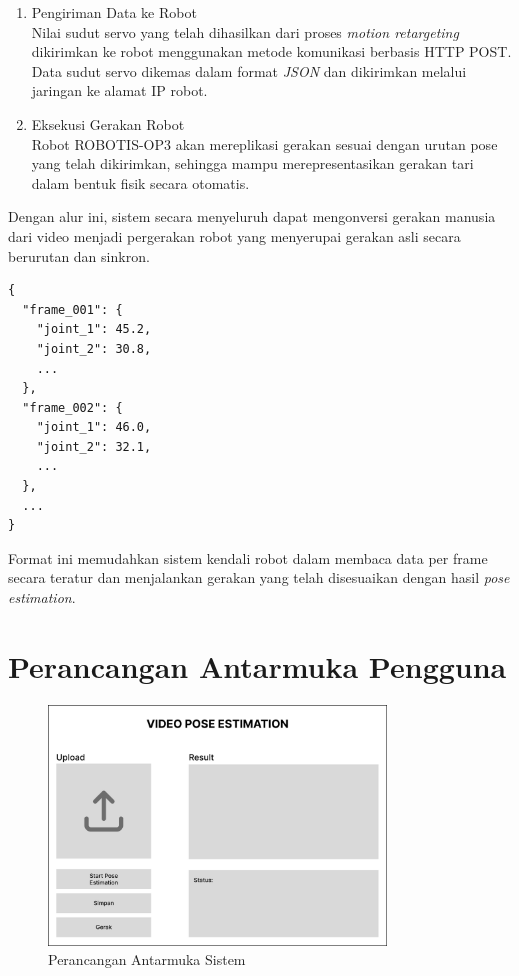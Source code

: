 \begin{enumerate}
    \item {Pengiriman Data ke Robot} \\
    Nilai sudut servo yang telah dihasilkan dari proses \textit{motion retargeting} dikirimkan ke robot menggunakan metode komunikasi berbasis HTTP POST. Data sudut servo dikemas dalam format \textit{JSON} dan dikirimkan melalui jaringan ke alamat IP robot.
    
    \item {Eksekusi Gerakan Robot} \\
    Robot ROBOTIS-OP3 akan mereplikasi gerakan sesuai dengan urutan pose yang telah dikirimkan, sehingga mampu merepresentasikan gerakan tari dalam bentuk fisik secara otomatis.
\end{enumerate}

Dengan alur ini, sistem secara menyeluruh dapat mengonversi gerakan manusia dari video menjadi pergerakan robot yang menyerupai gerakan asli secara berurutan dan sinkron.

\begin{lstlisting}[style=plainbox, caption={Pseudocode Struktur File JSON Gerakan}, label={lst:json_gerakan}]
{
  "frame_001": {
    "joint_1": 45.2,
    "joint_2": 30.8,
    ...
  },
  "frame_002": {
    "joint_1": 46.0,
    "joint_2": 32.1,
    ...
  },
  ...
}
\end{lstlisting}


Format ini memudahkan sistem kendali robot dalam membaca data per frame secara teratur dan menjalankan gerakan yang telah disesuaikan dengan hasil \textit{pose estimation}.

\section{Perancangan Antarmuka Pengguna}
    
\begin{figure}[H]
    \centering
    \includegraphics[width=0.8\textwidth]{images/Wireframe - 1.png}
    \caption{Perancangan Antarmuka Sistem}
    \label{fig:wireframe_ui}
\end{figure}

